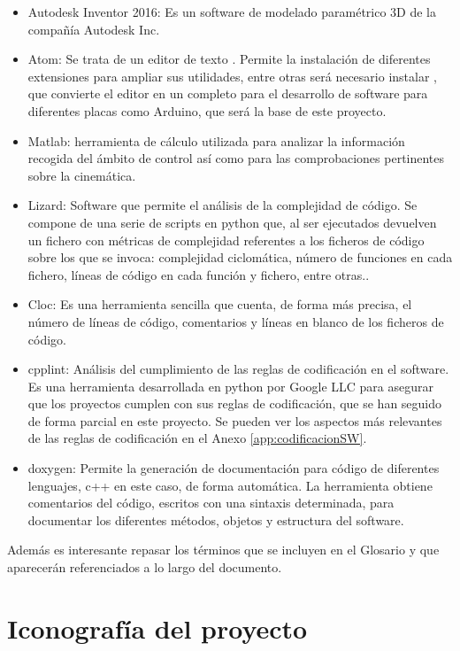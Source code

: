\begin{itemize}
    \item Autodesk Inventor 2016: Es un software de modelado paramétrico 3D de la compañía Autodesk Inc.
    \item Atom: Se trata de un editor de texto . Permite la instalación de diferentes extensiones para ampliar sus utilidades, entre otras será necesario instalar , que convierte el editor en un  completo para el desarrollo de software para diferentes placas como Arduino, que será la base de este proyecto.
    \item Matlab: herramienta de cálculo utilizada para analizar la información recogida del ámbito de control así como para las comprobaciones pertinentes sobre la cinemática.
    \item Lizard: Software que permite el análisis de la complejidad de código. Se compone de una serie de scripts en python que, al ser ejecutados devuelven un fichero con métricas de complejidad referentes a los ficheros de código sobre los que se invoca: complejidad ciclomática, número de funciones en cada fichero, líneas de código en cada función y fichero, entre otras..
    \item Cloc: Es una herramienta sencilla que cuenta, de forma más precisa, el número de líneas de código, comentarios y líneas en blanco de los ficheros de código.
    \item cpplint: Análisis del cumplimiento de las reglas de codificación en el software. Es una herramienta desarrollada en python por Google LLC para asegurar que los proyectos cumplen con sus reglas de codificación, que se han seguido de forma parcial en este proyecto. Se pueden ver los aspectos más relevantes de las reglas de codificación en el Anexo \ref{app:codificacionSW}.
    \item doxygen: Permite la generación de documentación para código de diferentes lenguajes, c++ en este caso, de forma automática. La herramienta obtiene comentarios del código, escritos con una sintaxis determinada, para documentar los diferentes métodos, objetos y estructura del software.
\end{itemize}

Además es interesante repasar los términos que se incluyen en el Glosario y que aparecerán referenciados a lo largo del documento. \completar

\section{Iconografía del proyecto}

